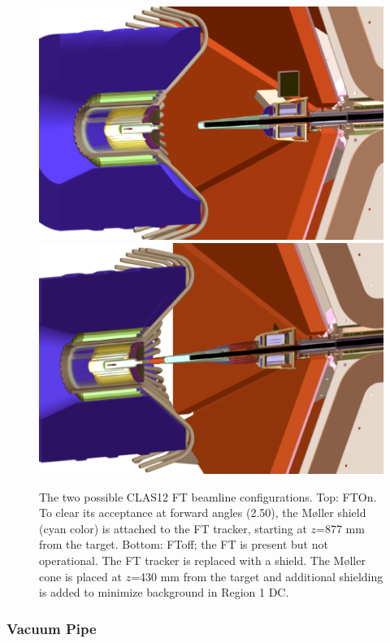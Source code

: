 \begin{figure}
	\centering
	\includegraphics[width=0.99\columnwidth,keepaspectratio]{img/ftOnGeometry.png}
	\includegraphics[width=0.99\columnwidth,keepaspectratio]{img/ftOffGeometry.png}
	\caption{The two possible CLAS12 FT beamline configurations. Top: FTOn. To clear its acceptance at forward angles (2.50\mdeg),
             the M\o ller shield (cyan color) is attached to the FT tracker, starting at $z$=877 mm from the target.
             Bottom: FToff; the FT is present but not operational. The FT tracker is replaced with a shield.
             The M\o ller cone is placed at $z$=430 mm from the target and additional shielding
             is added to minimize background in Region 1 DC.}
	\label{fig:beamlineGeometry}
\end{figure}

\subsubsection{Vacuum Pipe}

